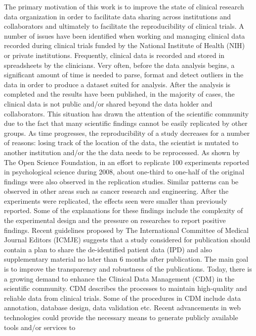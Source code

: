 \documentclass[]{spie}  %
\begin{document}
The primary motivation of this work is to improve the state of clinical research data organization in order to facilitate data sharing across institutions and collaborators and ultimately to facilitate the reproducibility of clinical trials.
A number of issues have been identified when working and managing clinical data recorded during clinical trials funded by the National Institute of Health 
(NIH) or private institutions. Frequently, clinical data is recorded and stored in spreadsheets by the clinicians. Very often, before the data analysis begins, 
a significant amount of time is needed to parse, format and detect outliers in the data in order to produce a dataset suited for analysis.
After the analysis is completed and the results have been published, in the majority of cases, 
the clinical data is not public and/or shared beyond the data holder and collaborators. 
This situation has drawn the attention of the scientific community due to the fact that many scientific findings cannot be easily replicated by other groups. 
As time progresses, the reproducibility of a study decreases for a number of reasons: losing track of the location of the data, the scientist is mutated to another institution and/or the the data needs to be reprocessed. As shown by The Open Science Foundation, in an effort to replicate 100 experiments reported in psychological science during 2008\cite{open2015estimating}, about one-third to one-half of the original findings were also observed in the replication studies. 
Similar patterns can be observed in other areas such as cancer research and engineering. 
After the experiments were replicated, the effects seen were smaller than previously reported. 
Some of the explanations for these findings include the complexity of the experimental design and the pressure on researches to report positive findings. 
Recent guidelines proposed by The International Committee of Medical Journal Editors (ICMJE) suggests that a study considered for publication should 
contain a plan to share the de-identified patient data (IPD) and also supplementary material no later than 6 months 
after publication\cite{doi:10.1001/jama.2015.18164}. The main goal is to improve the transparency and robustness of the publications. 
Today, there is a growing demand to enhance the Clinical Data Management (CDM) \cite{krishnankutty_data_2012} in the scientific community. 
CDM describes the processes to maintain high-quality and reliable data from clinical trials.  
Some of the procedures in CDM include data annotation, database design, data validation etc. 
Recent advancements in web technologies could provide the necessary means to generate publicly available tools and/or services to 
\end{document}
